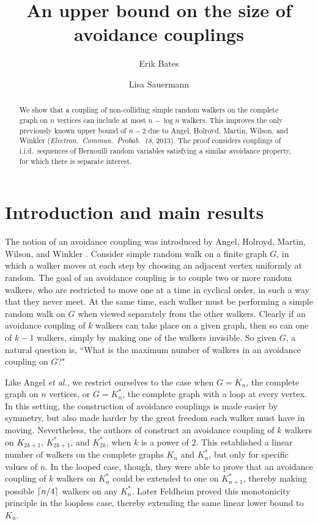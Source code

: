 \documentclass[11pt,reqno]{amsart} %
\title{An upper bound on the size of avoidance couplings}
\author{Erik Bates}
\author{Lisa Sauermann}
\numberwithin{equation}{section}
\theoremstyle{definition}
\DeclarePairedDelimiter\ceil{\lceil}{\rceil}
\begin{document}



\begin{abstract}
We show that a coupling of non-colliding simple random walkers on the complete graph on $n$ vertices can include at most $n - \log n$ walkers.
This improves the only previously known upper bound of $n-2$ due to Angel, Holroyd, Martin, Wilson, and Winkler ({\it Electron.~Commun.~Probab.~18},  2013).
The proof considers couplings of i.i.d.~sequences of Bernoulli random variables satisfying a similar avoidance property, for which there is separate interest.
\end{abstract}

\maketitle

\section{Introduction and main results} \label{intro}
The notion of an avoidance coupling was introduced by Angel, Holroyd, Martin, Wilson, and Winkler \cite{angel-holroyd-martin-wilson-winkler13}.
Consider simple random walk on a finite graph $G$, in which a walker moves at each step by choosing an adjacent vertex uniformly at random.
The goal of an avoidance coupling is to couple two or more random walkers, who are restricted to move one at a time in cyclical order, in such a way that they never meet. 
At the same time, each walker must be performing a simple random walk on $G$ when viewed separately from the other walkers.
Clearly if an avoidance coupling of $k$ walkers can take place on a given graph, then so can one of $k-1$ walkers, simply by making one of the walkers invisible.
So given $G$, a natural question is, ``What is the maximum number of walkers in an avoidance coupling on $G$?"

Like Angel \textit{et al.}, we restrict ourselves to the case when $G = K_n$, the complete graph on $n$ vertices, or $G=K_n^*$, the complete graph with a loop at every vertex.
In this setting, the construction of avoidance couplings is made easier by symmetry, but also made harder by the great freedom each walker must have in moving.
Nevertheless, the authors of \cite{angel-holroyd-martin-wilson-winkler13} construct an avoidance coupling of $k$ walkers on $K_{2k+1}$, $K_{2k+1}^*$, and $K_{2k}^*$, when $k$ is a power of $2$.
This established a linear number of walkers on the complete graphs $K_n$ and $K_n^*$, but only for specific values of $n$.
In the looped case, though, they were able to prove that an avoidance coupling of $k$ walkers on $K_n^*$ could be extended to one on $K_{n+1}^*$, thereby making possible $\ceil{n/4}$ walkers on any $K_n^*$.
Later Feldheim \cite{feldheim17} proved this monotonicity principle in the loopless case, thereby extending the same linear lower bound to $K_n$.
\end{document}
